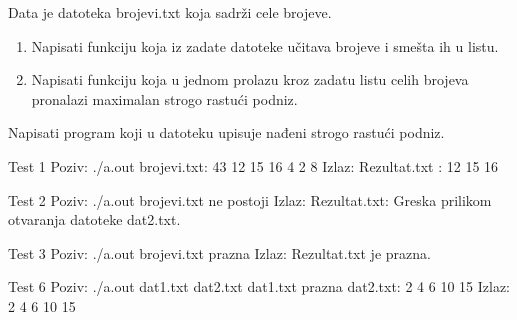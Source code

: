 \begin{Exercise}[label=611]
Data je datoteka brojevi.txt koja sadrži cele brojeve.
\begin{enumerate}
 \item Napisati funkciju koja iz zadate datoteke učitava brojeve i smešta ih u listu.
 \item Napisati funkciju koja u jednom prolazu kroz zadatu listu celih brojeva 
pronalazi maximalan strogo rastući podniz.
\end{enumerate}
Napisati program koji u datoteku  upisuje nađeni strogo rastući podniz.
\begin{miditest}
\begin{test}{Test 1}
Poziv: ./a.out
brojevi.txt:
  43 12 15 16 4 2 8
Izlaz: 
Rezultat.txt : 
  12 15 16
\end{test}
\begin{test}{Test 2}
Poziv: ./a.out
brojevi.txt ne postoji
Izlaz:
Rezultat.txt: 
  Greska prilikom otvaranja datoteke dat2.txt.
\end{test}
\begin{test}{Test 3}
Poziv: ./a.out 
brojevi.txt prazna
Izlaz: 
Rezultat.txt  je prazna.
\end{test}
\begin{test}{Test 6}
Poziv: ./a.out dat1.txt dat2.txt
dat1.txt prazna
dat2.txt: 
  2 4 6 10 15
Izlaz:
  2 4 6 10 15
\end{test}
\end{miditest}

\end{Exercise}
\begin{Answer}[ref=611]
\end{Answer}

